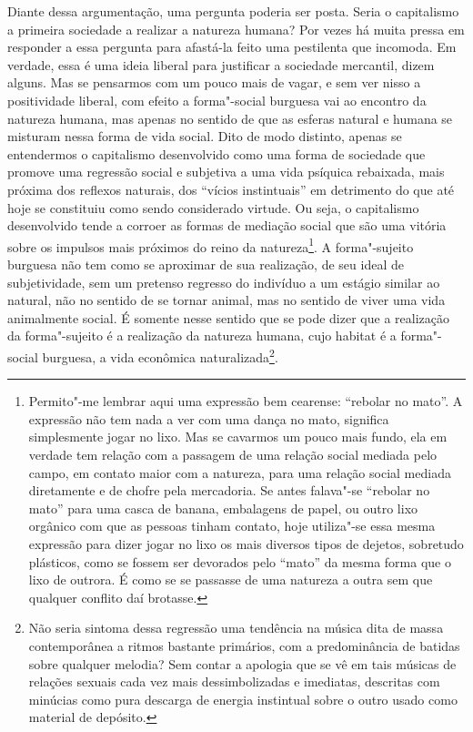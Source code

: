 Diante dessa argumentação, uma pergunta poderia ser posta. Seria o
capitalismo a primeira sociedade a realizar a natureza humana? Por vezes
há muita pressa em responder a essa pergunta para afastá-la feito uma
pestilenta que incomoda. Em verdade, essa é uma ideia liberal para
justificar a sociedade mercantil, dizem alguns. Mas se pensarmos com um
pouco mais de vagar, e sem ver nisso a positividade liberal, com efeito
a forma"-social burguesa vai ao encontro da natureza humana, mas apenas
no sentido de que as esferas natural e humana se misturam nessa forma de
vida social. Dito de modo distinto, apenas se entendermos o capitalismo
desenvolvido como uma forma de sociedade que promove uma regressão
social e subjetiva a uma vida psíquica rebaixada, mais próxima dos
reflexos naturais, dos ``vícios instintuais'' em detrimento do que até
hoje se constituiu como sendo considerado virtude. Ou seja, o
capitalismo desenvolvido tende a corroer as formas de mediação social
que são uma vitória sobre os impulsos mais próximos do reino da
natureza\footnote{Permito"-me lembrar aqui uma expressão bem cearense:
  ``rebolar no mato''. A expressão não tem nada a ver com uma dança no
  mato, significa simplesmente jogar no lixo. Mas se cavarmos um pouco
  mais fundo, ela em verdade tem relação com a passagem de uma relação
  social mediada pelo campo, em contato maior com a natureza, para uma
  relação social mediada diretamente e de chofre pela mercadoria. Se
  antes falava"-se ``rebolar no mato'' para uma casca de banana,
  embalagens de papel, ou outro lixo orgânico com que as pessoas tinham
  contato, hoje utiliza"-se essa mesma expressão para dizer jogar no lixo
  os mais diversos tipos de dejetos, sobretudo plásticos, como se fossem
  ser devorados pelo ``mato'' da mesma forma que o lixo de outrora. É
  como se se passasse de uma natureza a outra sem que qualquer conflito
  daí brotasse.}. A forma"-sujeito burguesa não tem como se aproximar de
sua realização, de seu ideal de subjetividade, sem um pretenso regresso
do indivíduo a um estágio similar ao natural, não no sentido de se
tornar animal, mas no sentido de viver uma vida animalmente social. É
somente nesse sentido que se pode dizer que a realização da
forma"-sujeito é a realização da natureza humana, cujo habitat é a
forma"-social burguesa, a vida econômica naturalizada\footnote{Não seria
  sintoma dessa regressão uma tendência na música dita de massa
  contemporânea a ritmos bastante primários, com a predominância de
  batidas sobre qualquer melodia? Sem contar a apologia que se vê em
  tais músicas de relações sexuais cada vez mais dessimbolizadas e
  imediatas, descritas com minúcias como pura descarga de energia
  instintual sobre o outro usado como material de depósito.}.


